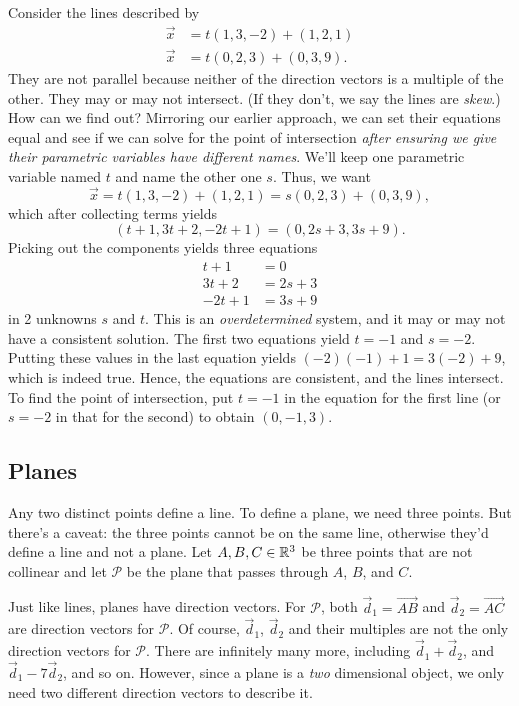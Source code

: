 \begin{example}
Consider the lines described by
\begin{align*}
	\vec x &= t(1, 3, -2 ) + ( 1, 2, 1 ) \\
	\vec x &= t( 0, 2, 3) + ( 0, 3, 9 ).
\end{align*}
They are not parallel because neither of the direction
vectors is a multiple
of the other.  They may or may not intersect.  (If they don't,
	we say the lines are \emph{skew}.)  How can we find out?  
	Mirroring our earlier approach, 
	we can set their equations equal and see if we can solve for the point
	of intersection \emph{after ensuring we give their parametric variables
	have
	different names}.   We'll keep one parametric variable named $t$ and name the
	other one $s$.  Thus, we want
\[
\vec x = t( 1, 3, -2 ) + ( 1, 2, 1 ) =
s( 0, 2, 3) + ( 0, 3, 9 ),
\]
which after collecting terms yields
\[
    ( t + 1, 3t + 2, -2t + 1 ) = ( 0, 2s + 3, 3s + 9).
\]
Picking out the components yields three equations
\begin{align*}
    t + 1 &= 0 \\
    3t +2 &= 2s + 3 \\
    -2t + 1 &=  3s + 9
\end{align*}
in 2 unknowns  $s$ and $t$.  This is an {\it overdetermined\/}
system, and it may or may not have a consistent solution.  
The first two equations yield $t = -1$  and $s = -2$.  Putting
these values in the last equation yields $(-2)(-1) + 1 = 3(-2) + 9$,
which is indeed true.
Hence, the equations are consistent, and the lines
intersect.   To find the point of intersection, put $t = -1$
in the equation for the first line (or
$s = -2$ in that for the second) to obtain  $( 0, -1, 3 )$.  
\end{example}

\subsection{Planes}

Any two distinct points define a line.  To define a plane, we
need three points.  But there's a caveat: the three points cannot
be on the same line, otherwise they'd define a line
and not a plane.  Let $A,B,C\in\mathbb{R}^3$ be three points that are not
collinear and let $\mathcal P$ be the plane that passes through $A$,
$B$, and $C$.

Just like lines, planes have direction vectors.  For $\mathcal P$, both
$\vec d_1=\overrightarrow{AB}$ and $\vec d_2=\overrightarrow{AC}$ are direction
vectors for $\mathcal P$.  Of course, $\vec d_1$, $\vec d_2$ and their multiples
are not the only direction vectors for $\mathcal P$. There are infinitely many more, including
$\vec d_1+\vec d_2$, and $\vec d_1-7\vec d_2$, and so on.  However, since a plane
is a \emph{two} dimensional object, we only need two different direction vectors to describe it.

